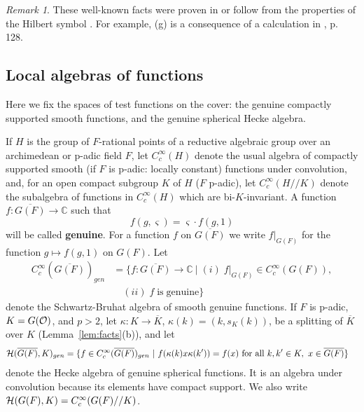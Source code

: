 \documentclass[12pt,letterpaper]{book}
\theoremstyle{plain}
\theoremstyle{definition}
\theoremstyle{remark}
\newtheorem{remark}[theorem]{Remark}
\theoremstyle{remark}
\begin{document}
\begin{remark}
These well-known facts
were proven in \cite{K2} or follow from the properties of the Hilbert
symbol \cite{W1}.
For example, (g) is a consequence of a calculation in \cite{Fl}, p. 128.
\end{remark}

\subsection{Local algebras of functions}\label{sec:localalg}

Here we fix the spaces of test functions on the cover: the genuine compactly supported smooth functions, and the genuine spherical Hecke algebra.


If $H$ is the group of $F$-rational points of a reductive algebraic group
over an archimedean
or p-adic field $F$, let $C_c^\infty (H)$ denote the usual
algebra of compactly supported smooth (if $F$ is p-adic: locally constant)
functions under convolution, and, for an open compact subgroup $K$ of
$H$ ($F$ p-adic), let $C_c^\infty (H//K)$ denote the subalgebra of
functions in $C_c^\infty(H)$ which are bi-$K$-invariant. A
function $f:\overline{G(F)}\rightarrow {\mathbb{C}}$ such that
\begin{equation}
f(g,\varsigma )=\varsigma \cdot f(g,1)\label{eq:genuine}
\end{equation}
will be called \textbf{genuine}. For a function $f$ on
$\overline{G(F)}$ we write $f|_{G(F)}$ for the function $g\mapsto f(g,1)$
on $G(F)$. Let
\begin{align*}
C_c^\infty (\overline{G(F)})_{gen}
&=\{f:\overline{G(F)}\rightarrow {\mathbb{C}}\
|\;(i)\;f|_{G(F)}\in C_c^\infty (G(F)),
\\
&\quad (ii)\;f\;\mathrm{is\;genuine}\}
\end{align*}
denote the Schwartz-Bruhat algebra of smooth genuine functions.
If $F$ is p-adic, $K=G({\cal O})$, and $p>2$, let
$\kappa:K\rightarrow\overline{K}$, $\kappa(k)=(k,s_K(k))$, be a splitting
of $\overline{K}$ over $K$ (Lemma~\ref{lem:facts}(b)), and let
\begin{align*}
{\cal{H}}(\overline{G(F)},K)_{gen}
&=\{f\in C_c^\infty (\overline{G(F)})_{gen}
\ |\ f(\kappa(k)x\kappa(k'))=f(x)\ \text{for all } k,k'\in K,\
x\in\overline{G(F)}\}
\end{align*}
denote the Hecke algebra of genuine spherical functions. It is an
algebra under convolution because its elements have compact support.
We also write ${\cal H}(G(F),K)=C_c^\infty(G(F)//K)$.
\end{document}
